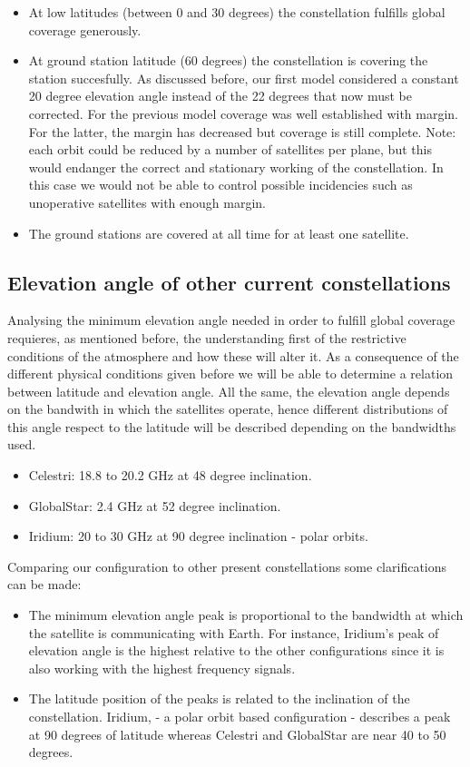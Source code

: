 \begin{itemize}
\item At low latitudes (between 0 and 30 degrees) the constellation fulfills global coverage generously.
\item At ground station latitude (60 degrees) the constellation is covering the station succesfully. As discussed before, our first model considered a constant 20 degree elevation angle instead of the 22 degrees that now must be corrected. For the previous model coverage was well established with margin. For the latter, the margin has decreased but coverage is still complete. Note: each orbit could be reduced by a number of satellites per plane, but this would endanger the correct and stationary working of the constellation. In this case we would not be able to control possible incidencies such as unoperative satellites with enough margin.
\item The ground stations are covered at all time for at least one satellite.
\end{itemize}

\subsection{Elevation angle of other current constellations}
Analysing the minimum elevation angle needed in order to fulfill global coverage requieres, as mentioned before, the understanding first of the restrictive conditions of the atmosphere and how these will alter it. As a consequence of the different physical conditions given before we will be able to determine a relation between latitude and elevation angle. All the same, the elevation angle depends on the bandwith in which the satellites operate, hence different distributions of this angle respect to the latitude will be described depending on the bandwidths used. 

\begin{itemize}
\item Celestri: 18.8 to 20.2 GHz at 48 degree inclination.
\item GlobalStar: 2.4 GHz at 52 degree inclination.
\item Iridium: 20 to 30 GHz at 90 degree inclination - polar orbits.
\end{itemize}

Comparing our configuration to other present constellations some clarifications can be made: 

\begin{itemize}
\item The minimum elevation angle peak is proportional to the bandwidth at which the satellite is communicating with Earth. For instance, Iridium's peak of elevation angle is the highest relative to the other configurations since it is also working with the highest frequency signals.
\item The latitude position of the peaks is related to the inclination of the constellation. Iridium, - a polar orbit based configuration - describes a peak at 90 degrees of latitude whereas Celestri and GlobalStar are near 40 to 50 degrees.
\end{itemize}

